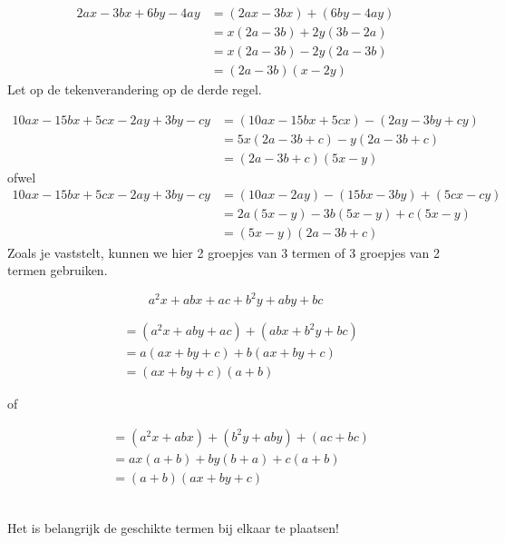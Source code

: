 \documentclass[12pt]{article}
\begin{document}
\begin{voorbeeld}
\begin{align*}
2ax - 3bx + 6by - 4ay	&= (2ax - 3bx) + (6by - 4ay)\\
                      &= x (2a - 3b) + 2y (3b - 2a)\\
                      &= x (2a - 3b) - 2y (2a - 3b)\\
                      &= (2a - 3b) (x - 2y)
\end{align*}
Let op de tekenverandering op de derde regel.
\end{voorbeeld}

\begin{voorbeeld}
\begin{align*}
10ax - 15bx + 5cx - 2ay + 3by - cy &= (10ax - 15bx + 5cx) - (2ay - 3by + cy)\\
                                   &= 5x (2a - 3b + c) - y (2a - 3b + c)\\
                                   &= (2a - 3b + c) (5x - y)
\end{align*}
ofwel
\begin{align*}
10ax - 15bx + 5cx - 2ay + 3by - cy &= (10ax - 2ay) - (15bx - 3by) + (5cx - cy)\\
                                   &= 2a (5x - y) - 3b (5x - y) + c (5x - y)\\
                                   &= (5x - y) (2a - 3b + c)
\end{align*}
Zoals je vaststelt, kunnen we hier 2 groepjes van 3 termen of 3 groepjes van 2 termen gebruiken.
\end{voorbeeld}

\begin{voorbeeld}
$$a^2x + abx + ac + b^2y + aby + bc$$

\begin{minipage}{0.4\textwidth}
\begin{align*}
&= (a^2x + aby + ac) + (abx + b^2y + bc)\\
&= a (ax + by + c) + b (ax + by + c)\\
&= (ax + by + c) (a + b)
\end{align*}
\end{minipage}
\begin{minipage}{0.2\textwidth}
\centering of
\end{minipage}
\begin{minipage}{0.4\textwidth}
\begin{align*}
&=(a^2x + abx) + (b^2y + aby) + (ac + bc)\\
&= ax (a + b) + by (b + a) + c (a + b)\\
&= (a + b) (ax + by + c)
\end{align*}
\end{minipage}\\[0.5cm]
Het is belangrijk de geschikte termen bij elkaar te plaatsen!
\end{voorbeeld}
\end{document}
